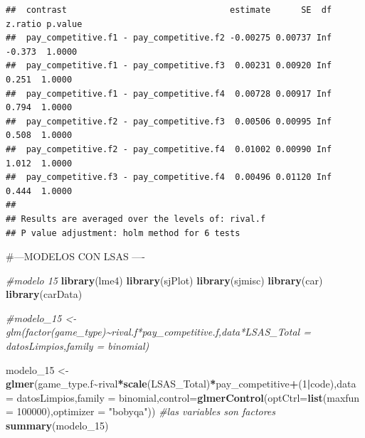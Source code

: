 \documentclass[
]{article}
\newenvironment{Shaded}{\begin{snugshade}}{\end{snugshade}}
\newcommand{\AttributeTok}[1]{\textcolor[rgb]{0.13,0.29,0.53}{#1}}
\newcommand{\CommentTok}[1]{\textcolor[rgb]{0.56,0.35,0.01}{\textit{#1}}}
\newcommand{\DecValTok}[1]{\textcolor[rgb]{0.00,0.00,0.81}{#1}}
\newcommand{\FunctionTok}[1]{\textcolor[rgb]{0.13,0.29,0.53}{\textbf{#1}}}
\newcommand{\NormalTok}[1]{#1}
\newcommand{\OtherTok}[1]{\textcolor[rgb]{0.56,0.35,0.01}{#1}}
\newcommand{\SpecialCharTok}[1]{\textcolor[rgb]{0.81,0.36,0.00}{\textbf{#1}}}
\newcommand{\StringTok}[1]{\textcolor[rgb]{0.31,0.60,0.02}{#1}}
\begin{document}
\begin{verbatim}
##  contrast                                estimate      SE  df z.ratio p.value
##  pay_competitive.f1 - pay_competitive.f2 -0.00275 0.00737 Inf  -0.373  1.0000
##  pay_competitive.f1 - pay_competitive.f3  0.00231 0.00920 Inf   0.251  1.0000
##  pay_competitive.f1 - pay_competitive.f4  0.00728 0.00917 Inf   0.794  1.0000
##  pay_competitive.f2 - pay_competitive.f3  0.00506 0.00995 Inf   0.508  1.0000
##  pay_competitive.f2 - pay_competitive.f4  0.01002 0.00990 Inf   1.012  1.0000
##  pay_competitive.f3 - pay_competitive.f4  0.00496 0.01120 Inf   0.444  1.0000
## 
## Results are averaged over the levels of: rival.f 
## P value adjustment: holm method for 6 tests
\end{verbatim}

\#---MODELOS CON LSAS ----

\begin{Shaded}
\begin{Highlighting}[]
\CommentTok{\#modelo 15}
\FunctionTok{library}\NormalTok{(lme4)}
\FunctionTok{library}\NormalTok{(sjPlot)}
\FunctionTok{library}\NormalTok{(sjmisc)}
\FunctionTok{library}\NormalTok{(car)}
\FunctionTok{library}\NormalTok{(carData)}


\CommentTok{\#modelo\_15 \textless{}{-} glm(factor(game\_type)\textasciitilde{}rival.f*pay\_competitive.f,data*LSAS\_Total = datosLimpios,family = binomial)}


\NormalTok{modelo\_15 }\OtherTok{\textless{}{-}} \FunctionTok{glmer}\NormalTok{(game\_type.f}\SpecialCharTok{\textasciitilde{}}\NormalTok{rival}\SpecialCharTok{*}\FunctionTok{scale}\NormalTok{(LSAS\_Total)}\SpecialCharTok{*}\NormalTok{pay\_competitive}\SpecialCharTok{+}\NormalTok{(}\DecValTok{1}\SpecialCharTok{|}\NormalTok{code),}\AttributeTok{data =}\NormalTok{ datosLimpios,}\AttributeTok{family =}\NormalTok{ binomial,}\AttributeTok{control=}\FunctionTok{glmerControl}\NormalTok{(}\AttributeTok{optCtrl=}\FunctionTok{list}\NormalTok{(}\AttributeTok{maxfun =} \DecValTok{100000}\NormalTok{),}\AttributeTok{optimizer =} \StringTok{"bobyqa"}\NormalTok{)) }\CommentTok{\#las variables son factores}
\FunctionTok{summary}\NormalTok{(modelo\_15)}
\end{Highlighting}
\end{Shaded}
\end{document}
